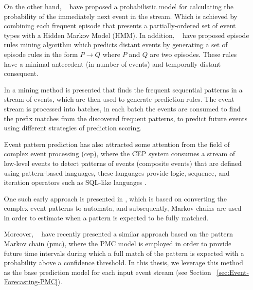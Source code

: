 \par On the other hand, ~\citet{laxman_stream_2008} have proposed a probabilistic model for calculating the probability of the immediately next event in the stream. Which is achieved by combining each frequent episode \cite{mannila1997discovery} that presents a partially-ordered set of event types with a Hidden Markov Model (HMM). In addition, ~\citet{fahed_efficient_2014} have proposed episode rules mining algorithm which predicts distant events by generating a set of episode rules in the form \(P \rightarrow Q \) where $P$ and $Q$ are two episodes. These rules have a minimal antecedent (in number of events) and temporally distant consequent.

\par In \cite{zhou_pattern_2015} a mining method is presented that finds the frequent sequential patterns in a stream of events, which are then used to generate prediction rules. The event stream is processed into batches, in each batch the events are consumed to find the prefix matches from the discovered frequent patterns, to predict future events using different strategies of prediction scoring.

\par Event pattern prediction has also attracted some attention from the field of complex event processing (\ac{cep}), where the CEP system consumes a stream of low-level events to detect patterns of events (composite events) that are defined using pattern-based languages, these languages provide logic, sequence, and iteration operators such as SQL-like languages \cite{Cugola:2012:PFI:2187671.2187677}. 
\par One such early approach is presented in \cite{muthusamy_predictive_2010}, which is based on converting the complex event patterns to automata, and subsequently, Markov chains are used in order to estimate when a pattern is expected to be fully matched. 
\par Moreover, ~\citet{alevizos2017event} have recently presented a similar approach based on the pattern Markov chain (\ac{pmc}), where the PMC model is employed in order to provide future time intervals during which a full match of the pattern is expected with a probability above a confidence threshold. In this thesis, we leverage this method as the base prediction model for each input event stream (see Section ~\ref{sec:Event-Forecasting-PMC}). 